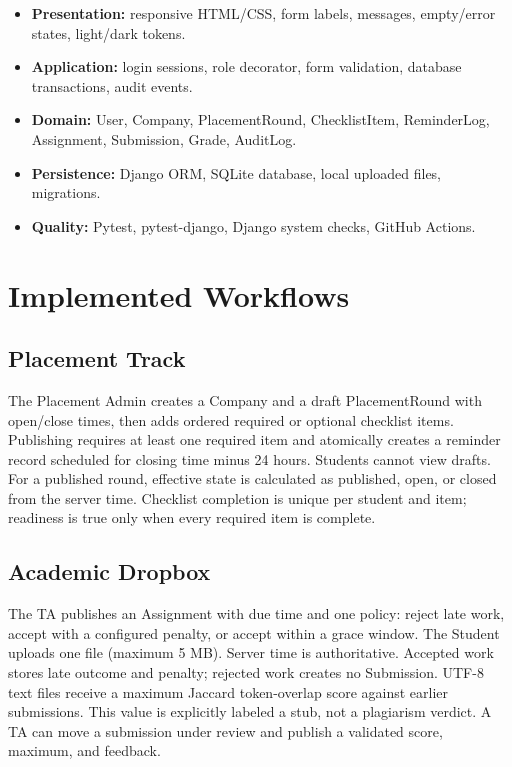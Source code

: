\documentclass[11pt,a4paper]{article}
\begin{document}
\begin{itemize}[leftmargin=0.7cm]
  \item \textbf{Presentation:} responsive HTML/CSS, form labels, messages, empty/error states, light/dark tokens.
  \item \textbf{Application:} login sessions, role decorator, form validation, database transactions, audit events.
  \item \textbf{Domain:} User, Company, PlacementRound, ChecklistItem, ReminderLog, Assignment, Submission, Grade, AuditLog.
  \item \textbf{Persistence:} Django ORM, SQLite database, local uploaded files, migrations.
  \item \textbf{Quality:} Pytest, pytest-django, Django system checks, GitHub Actions.
\end{itemize}

\section{Implemented Workflows}

\subsection{Placement Track}

The Placement Admin creates a Company and a draft PlacementRound with open/close times, then adds ordered required or optional checklist items. Publishing requires at least one required item and atomically creates a reminder record scheduled for closing time minus 24 hours. Students cannot view drafts. For a published round, effective state is calculated as published, open, or closed from the server time. Checklist completion is unique per student and item; readiness is true only when every required item is complete.

\subsection{Academic Dropbox}

The TA publishes an Assignment with due time and one policy: reject late work, accept with a configured penalty, or accept within a grace window. The Student uploads one file (maximum 5 MB). Server time is authoritative. Accepted work stores late outcome and penalty; rejected work creates no Submission. UTF-8 text files receive a maximum Jaccard token-overlap score against earlier submissions. This value is explicitly labeled a stub, not a plagiarism verdict. A TA can move a submission under review and publish a validated score, maximum, and feedback.
\end{document}
